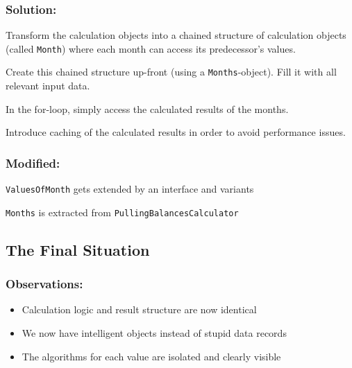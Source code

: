 \documentclass[a4paper,fleqn,titlepage,11pt]{article}
\begin{document}
\subsubsection*{Solution:}

Transform the calculation objects into a chained structure of calculation objects (called \texttt{Month}) where each month can access its predecessor's values.

Create this chained structure up-front (using a \texttt{Months}-object). Fill it with all relevant input data.

In the for-loop, simply access the calculated results of the months.

Introduce caching of the calculated results in order to avoid performance issues.

\subsubsection*{Modified:}

\texttt{ValuesOfMonth} gets extended by an interface and variants

\texttt{Months} is extracted from \texttt{PullingBalancesCalculator}

\subsection*{The Final Situation}

\subsubsection*{Observations:}

\begin{itemize}
\item Calculation logic and result structure are now identical
\item We now have intelligent objects instead of stupid data records
\item The algorithms for each value are isolated and clearly visible
\end{itemize}
\end{document}
